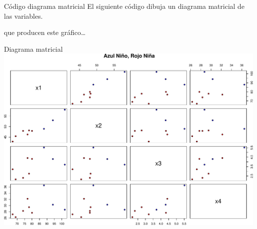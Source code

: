 \documentclass[
  ignorenonframetext,
]{beamer}
\newenvironment{Shaded}{\begin{snugshade}}{\end{snugshade}}
\newcommand{\AttributeTok}[1]{\textcolor[rgb]{0.77,0.63,0.00}{#1}}
\newcommand{\DecValTok}[1]{\textcolor[rgb]{0.00,0.00,0.81}{#1}}
\newcommand{\FunctionTok}[1]{\textcolor[rgb]{0.00,0.00,0.00}{#1}}
\newcommand{\NormalTok}[1]{#1}
\newcommand{\SpecialCharTok}[1]{\textcolor[rgb]{0.00,0.00,0.00}{#1}}
\newcommand{\StringTok}[1]{\textcolor[rgb]{0.31,0.60,0.02}{#1}}
\begin{document}
\begin{frame}[fragile]{Código diagrama matricial}
\protect\hypertarget{cuxf3digo-diagrama-matricial}{}
El siguiente código dibuja un diagrama matricial de las variables.

\begin{Shaded}
\end{Shaded}

que producen este gráfico\ldots{}
\end{frame}

\begin{frame}{Diagrama matricial}
\protect\hypertarget{diagrama-matricial}{}
\includegraphics{AnalisisComponentesPrincipales_fusion_files/figure-beamer/unnamed-chunk-2-1.pdf}
\end{frame}
\end{document}
